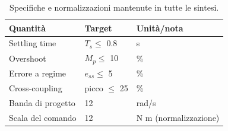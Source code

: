 \begin{table}[H]
\centering
\begin{tabular}{lll}
\toprule
Quantità & Target & Unità/nota \\
\midrule
Settling time & $T_s \leq$ 0.8 & s \\
Overshoot & $M_p \leq$ 10 & \% \\
Errore a regime & $e_{ss} \leq$ 5 & \% \\
Cross-coupling & picco $\leq$ 25 & \% \\
Banda di progetto & 12 & rad/s \\
Scala del comando & 12 & N m (normalizzazione) \\
\bottomrule
\end{tabular}
\caption{Specifiche e normalizzazioni mantenute in tutte le sintesi.}
\label{tab:specifications}
\end{table}
